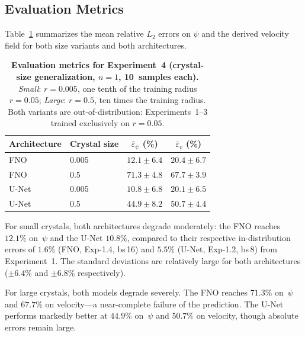 \subsection{Evaluation Metrics}
\label{ssec:results:exp4:metrics}

Table~\ref{tab:metrics_exp4} summarizes the mean relative $L_2$ errors on $\psi$ and the derived velocity field for both size variants and both architectures.

\begin{table}[htbp]
\centering
\caption{\textbf{Evaluation metrics for Experiment~4 (crystal-size generalization, $n=1$, 10~samples each).}
         \emph{Small}: $r = 0.005$, one tenth of the training radius $r = 0.05$; \emph{Large}: $r = 0.5$, ten times the training radius.
         Both variants are out-of-distribution: Experiments~1--3 trained exclusively on $r = 0.05$.}
\label{tab:metrics_exp4}
\begin{tabular}{llcc}
\toprule
\textbf{Architecture} & \textbf{Crystal size} & $\bar{\varepsilon}_\psi$ (\%) & $\bar{\varepsilon}_v$ (\%) \\
\midrule
FNO   & 0.005  & $12.1 \pm 6.4$ & $20.4 \pm 6.7$ \\
FNO   & 0.5  & $71.3 \pm 4.8$ & $67.7 \pm 3.9$ \\
\midrule
U-Net & 0.005  & $10.8 \pm 6.8$ & $20.1 \pm 6.5$ \\
U-Net & 0.5  & $44.9 \pm 8.2$ & $50.7 \pm 4.4$ \\
\bottomrule
\end{tabular}
\end{table}

For small crystals, both architectures degrade moderately: the FNO reaches $12.1\%$ on~$\psi$ and the U-Net $10.8\%$, compared to their respective in-distribution errors of $1.6\%$ (FNO, Exp-1.4, bs\,16) and $5.5\%$ (U-Net, Exp-1.2, bs\,8) from Experiment~1. The standard deviations are relatively large for both architectures ($\pm 6.4\%$ and $\pm 6.8\%$ respectively).

For large crystals, both models degrade severely. The FNO reaches $71.3\%$ on~$\psi$ and $67.7\%$ on velocity—a near-complete failure of the prediction. The U-Net performs markedly better at $44.9\%$ on~$\psi$ and $50.7\%$ on velocity, though absolute errors remain large.

